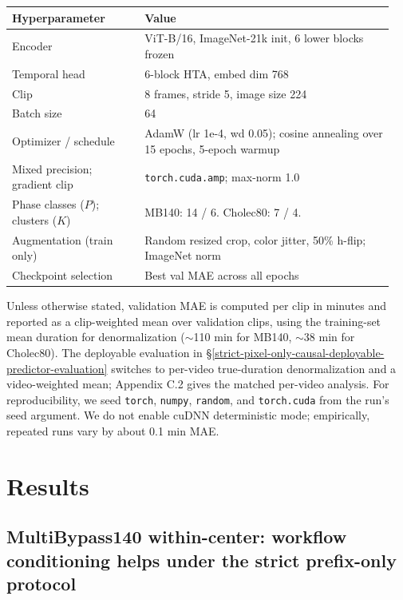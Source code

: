 \begingroup
\scriptsize
\setlength{\tabcolsep}{3pt}
\renewcommand{\arraystretch}{0.88}
\par\noindent\centering
\begin{tabular}{@{}p{0.33\linewidth}p{0.62\linewidth}@{}}
\toprule
Hyperparameter & Value \\
\midrule
Encoder & ViT-B/16, ImageNet-21k init, 6 lower blocks frozen \\
Temporal head & 6-block HTA, embed dim 768 \\
Clip & 8 frames, stride 5, image size 224 \\
Batch size & 64 \\
Optimizer / schedule & AdamW (lr 1e-4, wd 0.05); cosine annealing over
15 epochs, 5-epoch warmup \\
Mixed precision; gradient clip & \texttt{torch.cuda.amp}; max-norm
1.0 \\
Phase classes (\(P\)); clusters (\(K\)) & MB140: 14 / 6. Cholec80: 7 /
4. \\
Augmentation (train only) & Random resized crop, color jitter, 50\%
h-flip; ImageNet norm \\
Checkpoint selection & Best val MAE across all epochs \\
\bottomrule
\end{tabular}\par
\endgroup
Unless otherwise stated, validation MAE is computed per clip in minutes
and reported as a clip-weighted mean over validation clips, using the
training-set mean duration for denormalization (\(\sim\)110 min for
MB140, \(\sim\)38 min for Cholec80). The deployable evaluation in
\S\ref{strict-pixel-only-causal-deployable-predictor-evaluation} switches
to per-video true-duration denormalization and a video-weighted mean;
Appendix C.2 gives the matched per-video analysis. For reproducibility,
we seed \texttt{torch}, \texttt{numpy}, \texttt{random}, and
\texttt{torch.cuda} from the run's seed argument. We do not enable cuDNN
deterministic mode; empirically, repeated runs vary by about 0.1 min
MAE.

\section{Results}\label{results}

\subsection{MultiBypass140 within-center: workflow conditioning helps under the strict prefix-only
protocol}\label{multibypass140-within-center-workflow-conditioning-helps-under-the-strict-prefix-only-protocol}

